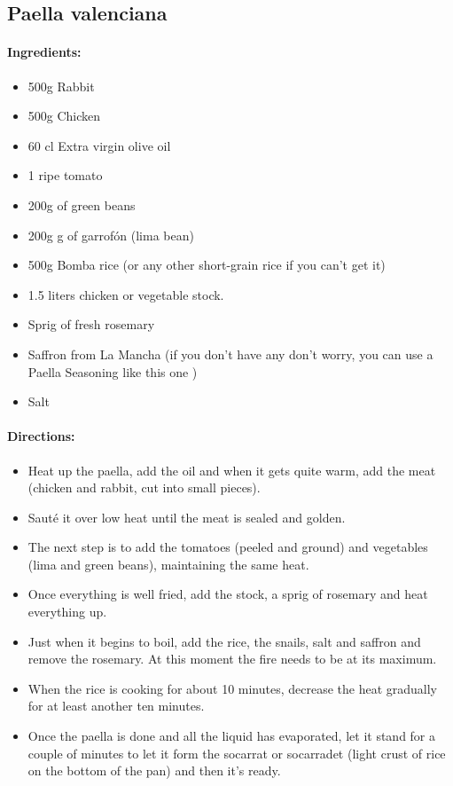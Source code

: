 \documentclass{article}
\begin{document}
\subsection{Paella valenciana}

\paragraph{Ingredients:}
\begin{itemize}
    \item 500g Rabbit
    \item 500g Chicken
    \item 60 cl Extra virgin olive oil
    \item 1 ripe tomato
    \item 200g of green beans
    \item 200g g of garrofón (lima bean)
    \item 500g Bomba rice (or any other short-grain rice if you can’t get it)
    \item 1.5 liters chicken or vegetable stock.
    \item Sprig of fresh rosemary
    \item Saffron from La Mancha (if you don’t have any don’t worry, you can use a Paella Seasoning like this one )
    \item Salt
\end{itemize}

\paragraph{Directions:}
\begin{itemize}
    \item Heat up the paella, add the oil and when it gets quite warm, add the meat (chicken and rabbit, cut into small pieces).
    \item Sauté it over low heat until the meat is sealed and golden.
    \item The next step is to add the tomatoes (peeled and ground) and vegetables (lima and green beans), maintaining the same heat.
    \item Once everything is well fried, add the stock, a sprig of rosemary and heat everything up.
    \item Just when it begins to boil, add the rice, the snails, salt and saffron and remove the rosemary. At this moment the fire needs to be at its maximum.
    \item When the rice is cooking for about 10 minutes, decrease the heat gradually for at least another ten minutes.
    \item Once the paella is done and all the liquid has evaporated, let it stand for a couple of minutes to let it form the socarrat or socarradet (light crust of rice on the bottom of the pan) and then it’s ready.
\end{itemize}
\end{document}
